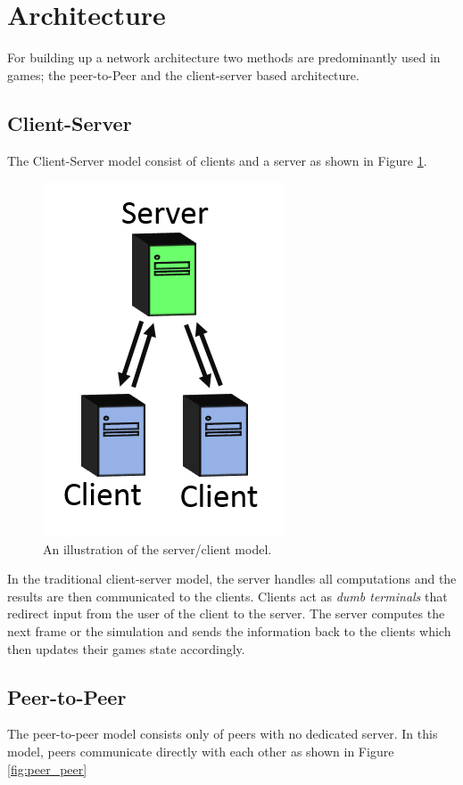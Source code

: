 \section{Architecture}
For building up a network architecture two methods are predominantly used in games; the peer-to-Peer and the client-server based architecture.

\subsection{Client-Server}\cite{networkingTypes}
The Client-Server model consist of clients and a server as shown in Figure \ref{fig:server_client}. 

\begin{figure}[H]
\centering
\includegraphics[scale=1]{figures/network/server_client}
\caption{An illustration of the server/client model.}
\label{fig:server_client}
\end{figure}

In the traditional client-server model, the server handles all computations and the results are then communicated to the clients.
Clients act as \textit{dumb terminals} that redirect input from the user of the client to the server.
The server computes the next frame or the simulation and sends the information back to the clients which then updates their games state accordingly.


\subsection{Peer-to-Peer}\cite{networkingTypes}
The peer-to-peer model consists only of peers with no dedicated server.
In this model, peers communicate directly with each other as shown in Figure \ref{fig:peer_peer}

